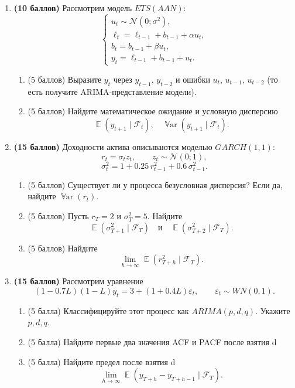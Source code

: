 \documentclass[12pt]{article}
\DeclareMathOperator{\Var}{\mathbb{V}ar}
\DeclareMathOperator{\E}{\mathbb{E}}
\newcommand \e{\varepsilon}
\newcommand \cN{\mathcal{N}}
\begin{document}
\begin{enumerate}
    
    \item \textbf{(10 баллов)} Рассмотрим модель $ETS(AAN)$:
    \[
    \begin{cases}
    u_t \sim \cN(0;\sigma^2),\\
    \ell_t = \ell_{t-1} + b_{t-1} + \alpha u_t,\\
    b_t = b_{t-1} + \beta u_t,\\
    y_t = \ell_{t-1} + b_{t-1} + u_t.
    \end{cases}
    \]
    
    \begin{enumerate}
        \item (5 баллов) Выразите $y_t$ через $y_{t-1}$, $y_{t-2}$ и ошибки $u_t$, $u_{t-1}$, $u_{t-2}$ (то есть получите ARIMA-представление модели).
        
        \item (5 баллов) Найдите математическое ожидание и условную дисперсию
        \[
        \E(y_{t+1}\mid \mathcal{F}_t), \quad \Var(y_{t+1}\mid \mathcal{F}_t).
        \]
        
    \end{enumerate}
    
    \item \textbf{(15 баллов)} Доходности актива описываются моделью $GARCH(1,1)$:
    \[
    r_t = \sigma_t z_t, \qquad z_t \sim \cN(0;1),
    \]
    \[
    \sigma_t^2 = 1 + 0.25\,r_{t-1}^2 + 0.6\,\sigma_{t-1}^2.
    \]
    
    \begin{enumerate}
        \item (5 баллов) Существует ли у процесса безусловная дисперсия? Если да, найдите $\Var(r_t)$.
        \item (5 баллов) Пусть $r_T=2$ и $\sigma_T^2=5$. Найдите
        \[
        \E(\sigma_{T+1}^2\mid \mathcal{F}_T)
        \quad \text{и} \quad
        \E(\sigma_{T+2}^2\mid \mathcal{F}_T).
        \]
        \item (5 баллов) Найдите
        \[
        \lim_{h\to\infty}\E(r_{T+h}^2\mid \mathcal{F}_T).
        \]
    \end{enumerate}
    
    \item \textbf{(15 баллов)} Рассмотрим уравнение
    \[
    (1-0.7L)(1-L)y_t = 3 + (1+0.4L)\e_t,
    \qquad \e_t \sim WN(0,1).
    \]
    
    \begin{enumerate}
        \item (5 балла) Классифицируйте этот процесс как $ARIMA(p,d,q)$. Укажите $p,d,q$.
        \item (5 балла) Найдите первые два значения ACF и PACF после взятия d
        \item (5 балла) Найдите предел после взятия d
        \[
        \lim_{h\to\infty}\E(y_{T+h}-y_{T+h-1}\mid \mathcal{F}_T).
        \]
    

\end{enumerate}
\end{enumerate}
\end{document}
